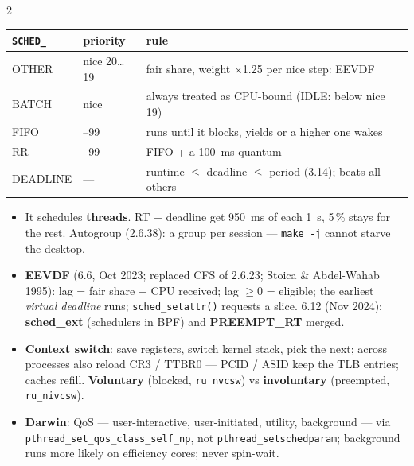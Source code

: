 \documentclass[8pt]{extarticle}
\newcommand\ct[1]{\texttt{#1}}
\newcommand\hd[1]{\par\vspace{2pt}\noindent{\bfseries\color{sheetBlue}#1}\par\vspace{1pt}}
\begin{document}
\begin{multicols}{2}
\hd{Scheduling — Linux policies}
{\setlength{\tabcolsep}{3pt}
\begin{tabular}{@{}>{\ttfamily}p{12mm}>{\raggedright\arraybackslash}p{13mm}>{\raggedright\arraybackslash}p{50mm}@{}}
\toprule
\normalfont\textbf{\ct{SCHED\_}} & \textbf{priority} & \textbf{rule} \\ \midrule
OTHER & nice \pdfonly{\textminus}\htmlonly{−}20…19 & fair share, weight $\times$1.25 per nice step: EEVDF \\
BATCH & nice & always treated as CPU-bound (IDLE: below nice 19) \\
FIFO & 1–99 & runs until it blocks, yields or a higher one wakes \\
RR & 1–99 & FIFO + a 100~ms quantum \\
DEADLINE & — & runtime $\le$ deadline $\le$ period (3.14); beats all others \\
\bottomrule
\end{tabular}}
\begin{itemize}
  \item It schedules \textbf{threads}. RT + deadline get 950~ms of each 1~s, 5\,\% stays for the
        rest. Autogroup (2.6.38): a group per session — \ct{make -j} cannot starve the desktop.
  \item \textbf{EEVDF} (6.6, Oct 2023; replaced CFS of 2.6.23; Stoica \& Abdel-Wahab 1995): lag =
        fair share $-$ CPU received; lag $\geq$0 = eligible; the earliest \emph{virtual deadline}
        runs; \ct{sched\_setattr()} requests a slice. 6.12 (Nov 2024): \textbf{sched\_ext}
        (schedulers in BPF) and \textbf{PREEMPT\_RT} merged.
  \item \textbf{Context switch}: save registers, switch kernel stack, pick the next; across
        processes also reload CR3 / TTBR0 — PCID / ASID keep the TLB entries; caches refill.
        \textbf{Voluntary} (blocked, \ct{ru\_nvcsw}) vs \textbf{involuntary} (preempted, \ct{ru\_nivcsw}).
  \item \textbf{Darwin}: QoS — user-interactive, user-initiated, utility, background — via
        \ct{pthread\_set\_qos\_class\_self\_np}, not \ct{pthread\_setschedparam}; background runs
        more likely on efficiency cores; never spin-wait.
\end{itemize}


\end{multicols}
\end{document}
